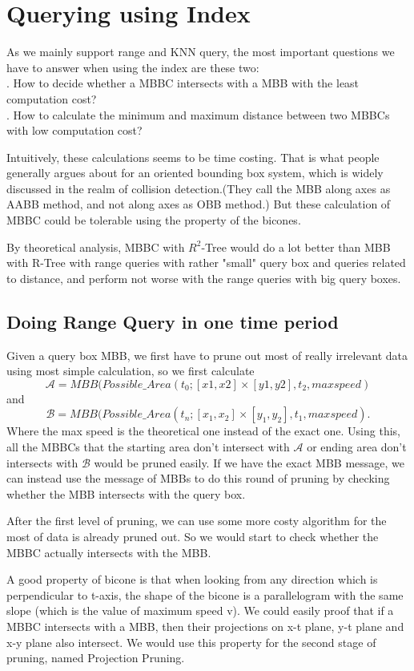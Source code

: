 \documentclass[sigplan]{acmart}
\begin{document}
\section{Querying using Index} \label{sec:query}
As we mainly support range and KNN query, the most important questions we have to answer when using the index are these two:\\
. How to decide whether a MBBC intersects with a MBB with the least computation cost?\\
. How to calculate the minimum and maximum distance between two MBBCs with low computation cost?\par
Intuitively, these calculations seems to be time costing. That is what people generally argues about for an oriented bounding box system, which is widely discussed in the realm of collision detection.(They call the MBB along axes as AABB method, and not along axes as OBB method.) But these calculation of MBBC could be tolerable using the property of the bicones.\par
By theoretical analysis, MBBC with $R^2$-Tree would do a lot better than MBB with R-Tree with range queries with rather "small" query box and queries related to distance, and perform not worse with the range queries with big query boxes.\par

\subsection{Doing Range Query in one time period}

Given a query box MBB, we first have to prune out most of really irrelevant data using most simple calculation, so we first calculate
$$\mathcal{A} = MBB(Possible\_Area(t_0;[x1,x2] \times [y1,y2], t_2, maxspeed)$$
and
$$\mathcal{B} = MBB(Possible\_Area(t_n;[x_1,x_2] \times [y_1,y_2], t_1, maxspeed).$$
Where the max speed is the theoretical one instead of the exact one. Using this, all the MBBCs that the starting area don't intersect with $\mathcal{A}$ or ending area don't intersects with $\mathcal{B}$ would be pruned easily. If we have the exact MBB message, we can instead use the message of MBBs to do this round of pruning by checking whether the MBB intersects with the query box. \par
After the first level of pruning, we can use some more costy algorithm for the most of data is already pruned out. So we would start to check whether the MBBC actually intersects with the MBB.\par
A good property of bicone is that when looking from any direction which is perpendicular to t-axis, the shape of the bicone is a parallelogram with the same slope (which is the value of maximum speed v). We could easily proof that if a MBBC intersects with a MBB, then their projections on x-t plane, y-t plane and x-y plane also intersect. We would use this property for the second stage of pruning, named Projection Pruning. \par
\end{document}
